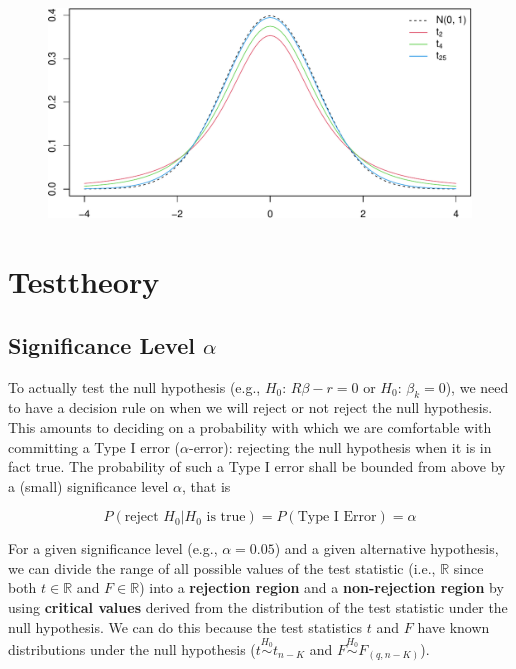 \documentclass[
  letterpaper,
  DIV=11,
  numbers=noendperiod]{scrreprt}
\theoremstyle{definition}
\theoremstyle{plain}
\theoremstyle{plain}
\theoremstyle{remark}
\begin{document}
\begin{figure}

{\centering \includegraphics{./05-Small-Sample-Inference_files/figure-pdf/unnamed-chunk-2-1.pdf}

}

\end{figure}

\hypertarget{testtheory}{%
\section{Testtheory}\label{testtheory}}

\hypertarget{significance-level-alpha}{%
\subsection{\texorpdfstring{Significance Level
\(\alpha\)}{Significance Level \textbackslash alpha}}\label{significance-level-alpha}}

To actually test the null hypothesis (e.g., \(H_0\): \(R\beta-r=0\) or
\(H_0\): \(\beta_k=0\)), we need to have a decision rule on when we will
reject or not reject the null hypothesis. This amounts to deciding on a
probability with which we are comfortable with committing a Type I error
(\(\alpha\)-error): rejecting the null hypothesis when it is in fact
true. The probability of such a Type I error shall be bounded from above
by a (small) significance level \(\alpha\), that is

\[
P(\text{reject } H_0| H_0\text{ is true})=P(\text{Type I Error})=\alpha
\]

For a given significance level (e.g., \(\alpha=0.05\)) and a given
alternative hypothesis, we can divide the range of all possible values
of the test statistic (i.e., \(\mathbb{R}\) since both
\(t\in\mathbb{R}\) and \(F\in\mathbb{R}\)) into a \textbf{rejection
region} and a \textbf{non-rejection region} by using \textbf{critical
values} derived from the distribution of the test statistic under the
null hypothesis. We can do this because the test statistics \(t\) and
\(F\) have known distributions under the null hypothesis
(\(t\overset{H_0}{\sim}t_{n-K}\) and
\(F\overset{H_0}{\sim}F_{(q,n-K)}\)).
\end{document}
